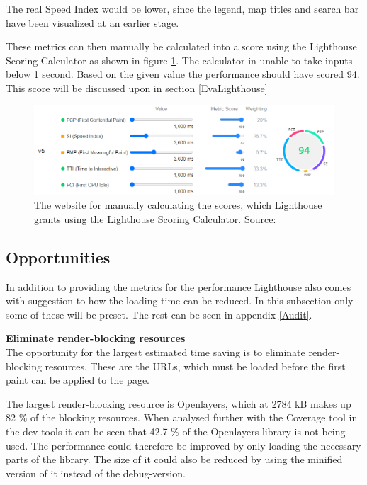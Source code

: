 The real Speed Index would be lower, since the legend, map titles and search bar have been visualized at an earlier stage. 

These metrics can then manually be calculated into a score using the Lighthouse Scoring Calculator as shown in figure \ref{ScoringManual}. The calculator in unable to take inputs below 1 second. Based on the given value the performance should have scored 94. This score will be discussed upon in section \ref{EvaLighthouse}


\begin{figure} [H]
	\centering
	\includegraphics[width=.9\textwidth]{Pictures/ScoringManual}
	\caption{The website for manually calculating the scores, which Lighthouse grants using the Lighthouse Scoring Calculator. Source: \citet{ScoreCalc}}
	\label{ScoringManual}
\end{figure}


\subsection{Opportunities}\label{Opportunities}
In addition to providing the metrics for the performance Lighthouse also comes with suggestion to how the loading time can be reduced. In this subsection only some of these will be preset. The rest can be seen in appendix \ref{Audit}.

\textbf{Eliminate render-blocking resources}\\
The opportunity for the largest estimated time saving is to eliminate render-blocking resources. These are the URLs, which must be loaded before the first paint can be applied to the page. \citep{RenderBlocking}

The largest render-blocking resource is Openlayers, which at 2784 kB makes up 82 \% of the blocking resources. When analysed further with the Coverage tool in the dev tools it can be seen that 42.7 \% of the Openlayers library is not being used. The performance could therefore be improved by only loading the necessary parts of the library. The size of it could also be reduced by using the minified version of it instead of the debug-version.
 



